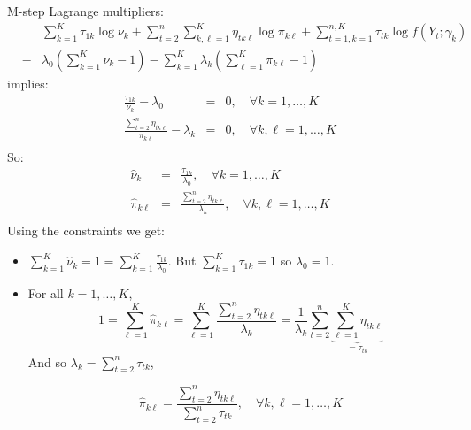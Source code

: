 \documentclass[compress,10pt]{beamer}
\begin{document}
\begin{frame}[allowframebreaks]{M-step}
Lagrange multipliers: 
\begin{eqnarray*}
&&\sum_{k=1}^K \tau_{1k} \log \nu_k + \sum_{t=2}^n \sum_{k, \ell=1}^K \eta_{tk\ell} \log \pi_{k\ell}  + \sum_{t=1, k=1}^{n,K} {\tau_{tk} \log f(Y_t; \gamma_k)} \\
&-&\lambda_0 \left(\sum_{k=1}^K \nu_k -1 \right)  - \sum_{k=1}^K  \lambda_k \left(\sum_{\ell=1}^K \pi_{ k\ell} -1\right) 
\end{eqnarray*}
implies: \begin{eqnarray*}
 \frac{\tau_{1k}}{\nu_k} - \lambda_0 &=& 0 , \quad \forall k=1, \dots, K\\ 
  \frac{\sum_{t=2}^n\eta_{tk\ell}}{\pi_{k\ell}} - \lambda_k  &=& 0 , \quad \forall k,\ell =1, \dots, K\\ 
\end{eqnarray*}
So: 
\begin{eqnarray*}
 \widehat{\nu}_k &=& \frac{\tau_{1k}}{\lambda_0} , \quad \forall k=1, \dots, K\\ 
  \widehat{\pi}_{k\ell} &=& \frac{\sum_{t=2}^n\eta_{tk\ell}}{\lambda_k} , \quad \forall k,\ell =1, \dots, K\\ 
\end{eqnarray*}
Using the constraints we get: 
\begin{itemize}
 \item $\sum_{k=1}^K\widehat{\nu}_k = 1 =\sum_{k=1}^K \frac{\tau_{1k}}{\lambda_0}$. But $\sum_{k=1}^K \tau_{1k} =1 $ so $\lambda_0=1$. 
\item For all $k=1,\dots, K$, 
$$1 = \sum_{\ell=1}^K \widehat{\pi}_{k\ell} =  \sum_{\ell=1}^K \frac{\sum_{t=2}^n\eta_{tk\ell}}{\lambda_k} = \frac{1}{\lambda_k}\sum_{t=2}^n \underbrace{\sum_{\ell=1}^K\eta_{tk\ell}}_{=\tau_{tk}} $$
And so $\lambda_k = \sum_{t=2}^n \tau_{tk} $, 

 $$\widehat{\pi}_{k\ell}= \frac{\sum_{t=2}^n\eta_{tk\ell}}{\sum_{t=2}^n \tau_{tk}} , \quad \forall k,\ell =1, \dots, K$$
 \end{itemize}
 



 
\end{frame} 
\end{document}
